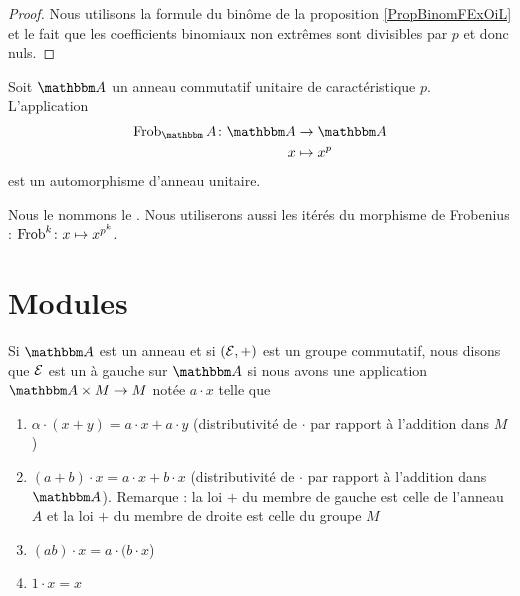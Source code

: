 \begin{proof}
    Nous utilisons la formule du binôme de la proposition \ref{PropBinomFExOiL} et le fait que les coefficients binomiaux non extrêmes sont divisibles par \( p\) et donc nuls.
\end{proof}

\begin{proposition} \label{PropFrobHAMkTY}
    Soit \( \eA\) un anneau commutatif unitaire de caractéristique \( p\). L'application
    \begin{equation}
        \begin{aligned}
            \Frob_\eA\colon \eA&\to \eA \\
            x&\mapsto x^p 
        \end{aligned}
    \end{equation}
    est un automorphisme d'anneau unitaire.
\end{proposition}
Nous le nommons le . Nous utiliserons aussi les itérés du morphisme de Frobenius : \( \operatorname{Frob}^k\colon x\mapsto x^{p^k}\).


\section{Modules}

Si \( \eA\) est un anneau et si \( (\mathcal{E},+)\) est un groupe commutatif, nous disons que \( \mathcal{E}\) est un  à gauche sur \( \eA\) si nous avons une application \( \eA\times M\to M\) notée \( a\cdot x\) telle que
\begin{enumerate}
    \item
       $\alpha\cdot(x + y) = a\cdot x + a\cdot y$  (distributivité de $\cdot$ par rapport à l'addition dans $M$)
   \item $(a + b) \cdot x = a \cdot x + b \cdot x$ (distributivité de $\cdot$ par rapport à l'addition dans \( \eA\)). Remarque :  la loi $+$ du membre de gauche est celle de l'anneau $A$ et la loi $+$ du membre de droite est celle du groupe $M$
   \item $(ab) \cdot x = a \cdot (b \cdot x$)
   \item $1 \cdot x = x$ 
\end{enumerate}

